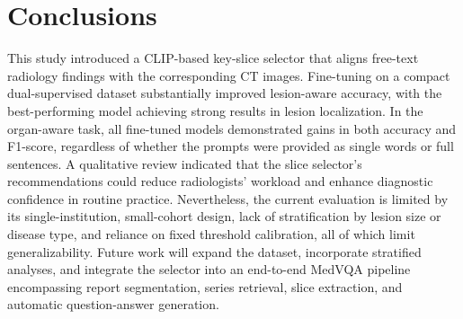 \documentclass[bioengineering,article,submit,pdftex,moreauthors]{Definitions/mdpi}
\begin{document}

\section{Conclusions}

This study introduced a CLIP-based key-slice selector that aligns free-text radiology findings with the corresponding CT images. Fine-tuning on a compact dual-supervised dataset substantially improved lesion-aware accuracy, with the best-performing model achieving strong results in lesion localization. In the organ-aware task, all fine-tuned models demonstrated gains in both accuracy and F1-score, regardless of whether the prompts were provided as single words or full sentences. A qualitative review indicated that the slice selector’s recommendations could reduce radiologists’ workload and enhance diagnostic confidence in routine practice. Nevertheless, the current evaluation is limited by its single-institution, small-cohort design, lack of stratification by lesion size or disease type, and reliance on fixed threshold calibration, all of which limit generalizability. Future work will expand the dataset, incorporate stratified analyses, and integrate the selector into an end-to-end MedVQA pipeline encompassing report segmentation, series retrieval, slice extraction, and automatic question-answer generation.

\vspace{6pt} 


\end{document}
